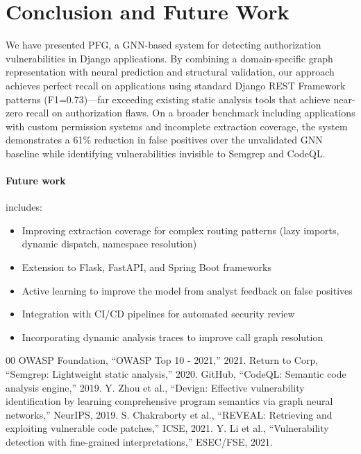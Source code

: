 \documentclass[conference]{IEEEtran}
\begin{document}
\section{Conclusion and Future Work}

We have presented PFG, a GNN-based system for detecting authorization vulnerabilities in Django applications. By combining a domain-specific graph representation with neural prediction and structural validation, our approach achieves perfect recall on applications using standard Django REST Framework patterns (F1=0.73)---far exceeding existing static analysis tools that achieve near-zero recall on authorization flaws. On a broader benchmark including applications with custom permission systems and incomplete extraction coverage, the system demonstrates a 61\% reduction in false positives over the unvalidated GNN baseline while identifying vulnerabilities invisible to Semgrep and CodeQL.

\paragraph{Future work} includes:
\begin{itemize}
    \item Improving extraction coverage for complex routing patterns (lazy imports, dynamic dispatch, namespace resolution)
    \item Extension to Flask, FastAPI, and Spring Boot frameworks
    \item Active learning to improve the model from analyst feedback on false positives
    \item Integration with CI/CD pipelines for automated security review
    \item Incorporating dynamic analysis traces to improve call graph resolution
\end{itemize}

\begin{thebibliography}{00}
 OWASP Foundation, ``OWASP Top 10 - 2021,'' 2021.
 Return to Corp, ``Semgrep: Lightweight static analysis,'' 2020.
 GitHub, ``CodeQL: Semantic code analysis engine,'' 2019.
 Y. Zhou et al., ``Devign: Effective vulnerability identification by learning comprehensive program semantics via graph neural networks,'' NeurIPS, 2019.
 S. Chakraborty et al., ``REVEAL: Retrieving and exploiting vulnerable code patches,'' ICSE, 2021.
 Y. Li et al., ``Vulnerability detection with fine-grained interpretations,'' ESEC/FSE, 2021.
\end{thebibliography}
\end{document}
